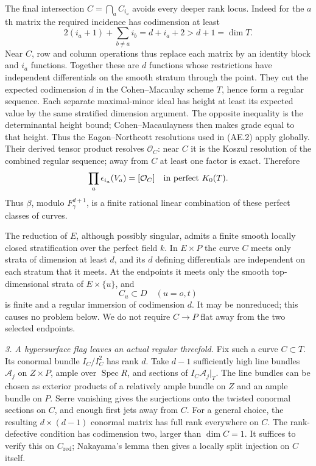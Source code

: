 The final intersection $C=\bigcap_aC_{i_a}$ avoids every deeper
rank locus.  Indeed for the $a$th matrix the required incidence
has codimension at least
\begin{equation}
             2(i_a+1)+\sum_{b\ne a}i_b
                    =d+i_a+2>d+1=\dim T.             \tag{AE.6}
\end{equation}
Near $C$, row and column operations thus replace each matrix by
an identity block and $i_a$ functions.  Together these are $d$
functions whose restrictions have independent differentials on
the smooth stratum through the point.  They cut the expected
codimension $d$ in the Cohen--Macaulay scheme $T$, hence form a
regular sequence.  Each separate maximal-minor ideal has height
at least its expected value by the same stratified dimension
argument.  The opposite inequality is the determinantal height
bound\citep[Theorem 2.1 and proof, pp.~10--11]
{D_BrunsVetter1988Determinantal}; Cohen--Macaulayness then makes
grade equal to that height.  Thus the Eagon--Northcott resolutions
used in (AE.2) apply globally.
Their derived tensor product resolves $\mathcal O_C$: near $C$
it is the Koszul resolution of the combined regular sequence;
away from $C$ at least one factor is exact.  Therefore
\[
                  \prod_a\epsilon_{i_a}(V_a)=[\mathcal O_C]
                         \quad\hbox{in perfect }K_0(T).
\]
Thus $\beta$, modulo $F_\gamma^{d+1}$, is a finite rational
linear combination of these perfect classes of curves.

The reduction of $E$, although possibly singular, admits a finite
smooth locally closed stratification over the perfect field $k$.
In $E\times P$ the curve $C$ meets only strata of dimension at
least $d$, and its $d$ defining differentials are independent on
each stratum that it meets.  At the endpoints it meets only the
smooth top-dimensional strata of $E\times\{u\}$, and
\begin{equation}
         C_u\subset D\quad(u=o,t)
\end{equation}
is finite and a regular immersion of codimension $d$.  It may
be nonreduced; this causes no problem below.  We do not require
$C\to P$ flat away from the two selected endpoints.

\emph{3. A hypersurface flag leaves an actual regular threefold.}
Fix such a curve $C\subset T$.  Its conormal bundle
$I_C/I_C^2$ has rank $d$.  Take $d-1$ sufficiently high line
bundles $\mathcal A_j$ on $Z\times P$, ample over
$\operatorname{Spec}R$, and sections of
$I_C\mathcal A_j|_T$.  The line bundles can be chosen as exterior
products of a relatively ample bundle on $Z$ and an ample bundle
on $P$.  Serre vanishing gives the surjections onto the twisted
conormal sections on $C$, and enough first jets away from $C$.
For a general choice, the resulting $d\times(d-1)$ conormal
matrix has full rank everywhere on $C$.  The rank-defective
condition has codimension two, larger than $\dim C=1$.
It suffices to verify this on $C_{\mathrm{red}}$; Nakayama's
lemma then gives a locally split injection on $C$ itself.

